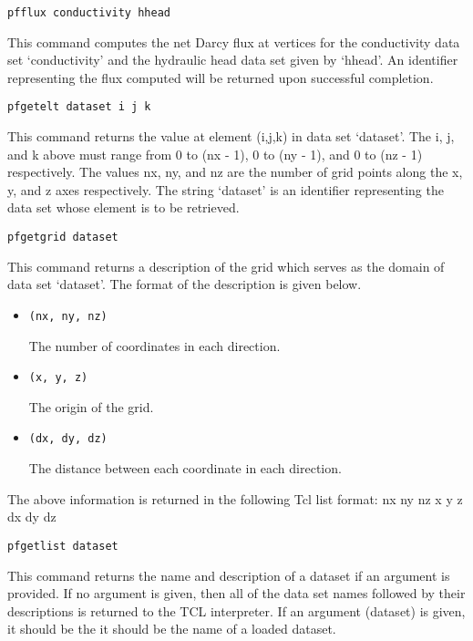 \begin{description}
\item{\begin{verbatim}pfflux conductivity hhead\end{verbatim}}
This command computes the net Darcy flux at vertices for the
conductivity data set `conductivity' and the hydraulic head data      
set given by `hhead'.  An identifier representing the flux computed   
will be returned upon successful completion.
    
\item{\begin{verbatim}pfgetelt dataset i j k\end{verbatim}}
This command returns the value at element (i,j,k) in data set         
`dataset'.  The i, j, and k above must range from 0 to (nx - 1), 0 to 
(ny - 1), and 0 to (nz - 1) respectively.  The values nx, ny, and nz
are the number of grid points along the x, y, and z axes respectively.
The string `dataset' is an identifier representing the data set whose
element is to be retrieved.

\item{\begin{verbatim}pfgetgrid dataset\end{verbatim}}
This command returns a description of the grid which serves as the
domain of data set `dataset'.  The format of the description is given 
below.
\begin{itemize}
\item{\begin{verbatim}(nx, ny, nz)\end{verbatim}
The number of coordinates in each direction.}
\item{\begin{verbatim}(x, y, z)\end{verbatim}The origin of the grid.}
\item{\begin{verbatim}(dx, dy, dz)\end{verbatim}The distance between each
coordinate in each direction.}
\end{itemize}
The above information is returned in the following Tcl list format:
{nx ny nz} {x y z} {dx dy dz}
           
\item{\begin{verbatim}pfgetlist dataset\end{verbatim}}
This command returns the name and description of a dataset if an argument is provided.  
If no argument is given, then all of the data set names followed by their descriptions 
is returned to the TCL interpreter. If an argument (dataset) is given, it should be the 
it should be the name of a loaded dataset. 


\end{description}
